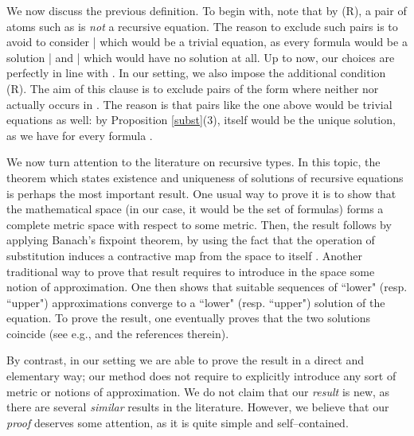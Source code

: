 \documentclass[copyright,creativecommons]{eptcs}
\def\eg{e.g., }
\theoremstyle{definition}
\begin{document}
We now discuss the previous definition.
To begin with, note that by (R),    a pair of atoms such as
 is   \emph{not} a recursive equation.
The reason to exclude such pairs is
to avoid  to consider  | which would be a trivial equation, as every formula would be a solution |
and  |
which would have  no solution at all.
Up to now, our  choices are perfectly in line with \cite{Courcelle,coppo}.
In our setting,  we also impose the additional condition   (R). The aim of this clause is to exclude pairs
of the form  where neither
 nor  actually occurs in .
The reason is  that   pairs like
the one above would be trivial equations as well:
by Proposition \ref{subst}(3),  itself would  be
 the unique solution, as   we have  for every formula .

We now turn attention to the literature on recursive types.
In this topic, the theorem which states
 existence and  uniqueness of solutions of recursive equations
is perhaps the most important result.
One usual way to prove  it is to show that  the mathematical space (in our case, it would be the set of formulas) forms a complete metric space with
respect to some  metric.  Then, the result  follows
by applying Banach's fixpoint theorem,  by using the fact
that the operation of substitution induces
a contractive map from the space  to itself  \cite{Courcelle,coppo}.
Another traditional way
 to prove that result requires to introduce  in the space  some  notion of approximation.  One then shows that   suitable  sequences of ``lower" (resp. ``upper") approximations
converge to a ``lower" (resp. ``upper") solution of the equation.
To prove the result, one eventually proves    that the two solutions coincide (see \eg \cite{MelVou,BT} and the references therein).

By contrast, in our setting we are able to prove the result in  a  direct and elementary way; our method does not require to  explicitly introduce any sort of metric or notions of approximation.
  We do  not claim that our \emph{result} is new, as there are several \emph{similar}  results in the literature.
However, we believe that
our \emph{proof} deserves some attention, as  it is quite simple and self--contained.
\end{document}
